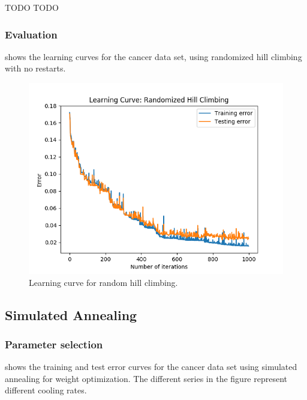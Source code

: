 \documentclass{article}
\begin{document}
        TODO TODO

      \subsubsection{Evaluation}
         shows the learning curves for the cancer data set, using randomized hill climbing with no restarts.

        \begin{figure}[htb]
        \centering
        \includegraphics[width=.5\linewidth]{out/plot/RHC.png}
        \caption{Learning curve for random hill climbing.}
        \label{fig:rhc-learning}
        \end{figure}

    \subsection{Simulated Annealing}

      \subsubsection{Parameter selection}
         shows the training and test error curves for the cancer data set using simulated annealing for weight optimization. The different series in the figure represent different cooling rates.
\end{document}

